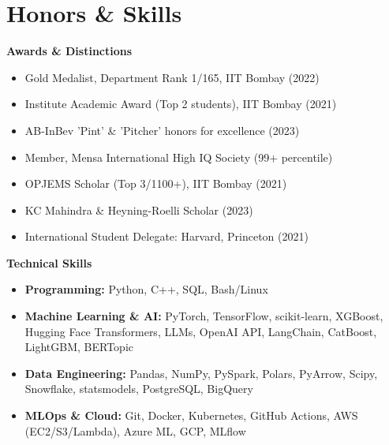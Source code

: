 \documentclass[letterpaper,10pt]{article}
\begin{document}
\section{Honors \& Skills}
{\small
\begin{multicols}{2}

{\vspace{-4pt}\scshape\raggedright\large\bfseries Awards \& Distinctions}\vspace{-6pt}
\begin{itemize}[leftmargin=0.15in, itemsep=-2pt]
  \item Gold Medalist, Department Rank 1/165, IIT Bombay (2022)
  \item Institute Academic Award (Top 2 students), IIT Bombay (2021)
  \item AB-InBev 'Pint' \& 'Pitcher' honors for excellence (2023)
  \item Member, Mensa International High IQ Society (99+ percentile)
  \item OPJEMS Scholar (Top 3/1100+), IIT Bombay (2021)
  \item KC Mahindra \& Heyning-Roelli Scholar  (2023)
  \item International Student Delegate: Harvard, Princeton (2021)
\end{itemize}

\columnbreak

{\vspace{-4pt}\scshape\raggedright\large\bfseries Technical Skills}\vspace{4pt}
\begin{itemize}[leftmargin=0.15in]
  \item \textbf{Programming:} Python, C++, SQL, Bash/Linux 
  \item \textbf{Machine Learning \& AI:} PyTorch, TensorFlow, scikit-learn, XGBoost, Hugging Face Transformers, LLMs, OpenAI API, LangChain, CatBoost, LightGBM, BERTopic
  \item \textbf{Data Engineering:} Pandas, NumPy, PySpark, Polars, PyArrow, Scipy, Snowflake, statsmodels, PostgreSQL, BigQuery
  \item \textbf{MLOps \& Cloud:} Git, Docker, Kubernetes, GitHub Actions, AWS (EC2/S3/Lambda), Azure ML, GCP, MLflow
\end{itemize}

\end{multicols}
}
\vspace{-16pt}
\end{document}
